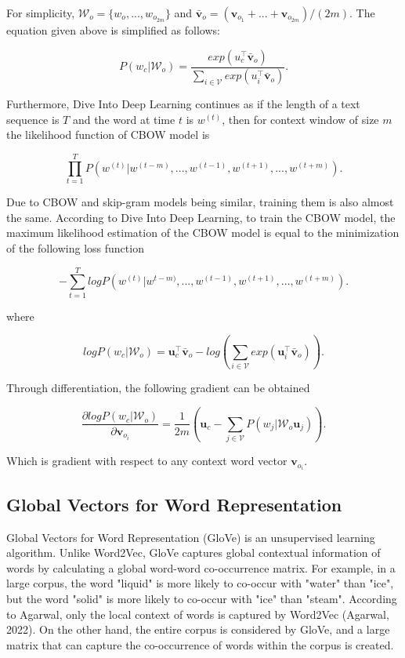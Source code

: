\documentclass[man]{apa7}
\begin{document}
For simplicity, $\mathcal{W}_o = \{ w_o,...,w_{o_{2m}}\}$ and $\bar{\mathbf{v}}_o = (\mathbf{v}_{o_1}+...+\mathbf{v}_{o_{2m}})/(2m)$. The equation given above is simplified as follows:

\begin{equation}
P(w_c | \mathcal{W}_o) = \frac{exp(u_c^\top \bar{\mathbf{v}}_o)}{\sum_{i \in \mathcal{V}} exp(u_i^\top \bar{\mathbf{v}}_o)}.
\end{equation}

Furthermore, Dive Into Deep Learning continues as if the length of a text sequence is $\mathit{T}$ and the word at time $t$ is $w^{(t)}$, then for context window of size $m$ the likelihood function of CBOW model is

\begin{equation}
\prod_{t=1}^T P(w^{(t)}| w^{(t-m)},..., w^{(t-1)},w^{(t+1)},...,w^{(t+m)}).
\end{equation}

Due to CBOW and skip-gram models being similar, training them is also almost the same. According to Dive Into Deep Learning, to train the CBOW model, the maximum likelihood estimation of the CBOW model is equal to the minimization of the following loss function

\begin{equation}
- \sum_{t=1}^T logP(w^{(t)} | w^{t-m)} ,..., w^{(t-1)} ,w^{(t+1)}, ...,w^{(t+m)}).
\end{equation}

where

\begin{equation}
logP(w_c | \mathcal{W}_o) = \mathbf{u}_c^\top \bar{\mathbf{v}}_o - log(\sum_{i \in \mathcal{V}} exp(\mathbf{u}_i^\top \bar{\mathbf{v}}_o)).
\end{equation}

Through differentiation, the following gradient can be obtained

\begin{equation}
\frac{\partial log P(w_c| \mathcal{W}_o )}{\partial \mathbf{v}_{o_i}} = \frac{1}{2m}(\mathbf{u}_c - \sum_{j \in \mathcal{V}} P(w_j| \mathcal{W}_o \mathbf{u}_j)).
\end{equation}

Which is gradient with respect to any context word vector $\mathbf{v}_{o_i}$. 

\subsection{Global Vectors for Word Representation}
Global Vectors for Word Representation (GloVe) is an unsupervised learning algorithm. Unlike Word2Vec, GloVe captures global contextual information of words by calculating a global word-word co-occurrence matrix. For example, in a large corpus, the word "liquid" is more likely to co-occur with "water" than "ice", but the word "solid" is more likely to co-occur with "ice" than "steam". According to Agarwal, only the local context of words is captured by Word2Vec (Agarwal, 2022). On the other hand, the entire corpus is considered by GloVe, and a large matrix that can capture the co-occurrence of words within the corpus is created.
\\[2\baselineskip]
\end{document}
